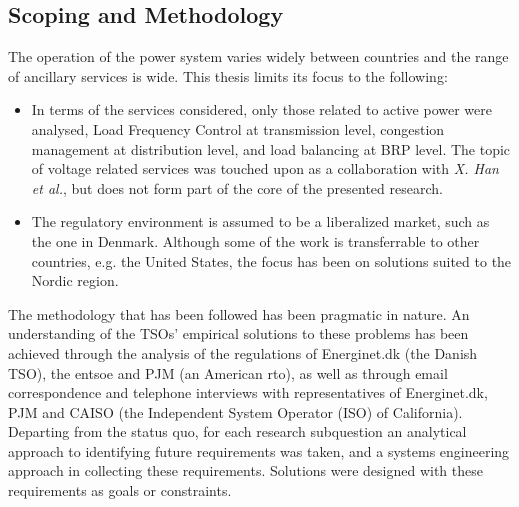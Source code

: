 \subsection*{Scoping and Methodology}
The operation of the power system varies widely between countries and the range of ancillary services is wide. This thesis limits its focus to the following:
\begin{itemize}
	\item In terms of the services considered, only those related to active power were analysed, \ie Load Frequency Control at transmission level, congestion management at distribution level, and load balancing at BRP level. The topic of voltage related services was touched upon as a collaboration with \emph{X. Han et al.}, but does not form part of the core of the presented research.
	\item The regulatory environment is assumed to be a liberalized market, such as the one in Denmark. Although some of the work is transferrable to other countries, e.g. the United States, the focus has been on solutions suited to the Nordic region.
\end{itemize}

The methodology that has been followed has been pragmatic in nature. An understanding of the TSOs' empirical solutions to these problems has been achieved through the analysis of the regulations of Energinet.dk (the Danish TSO), the \gls{entsoe} and PJM (an American \gls{rto}), as well as through email correspondence and telephone interviews with representatives of Energinet.dk, PJM and CAISO (the Independent System Operator (ISO) of California). Departing from the status quo, for each research subquestion an analytical approach to identifying future requirements was taken, and a systems engineering approach in collecting these requirements. Solutions were designed with these requirements as goals or constraints.

